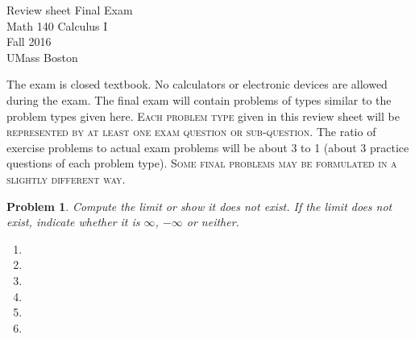 \documentclass{article}
\renewcommand{\fcProblemRef}{\theproblem.\theenumi}
\newtheorem{problem}{Problem}
\begin{document}
\begin{center}
\Large
Review sheet Final Exam \\ Math 140 Calculus I \\ \normalsize Fall 2016 \\ UMass Boston
\end{center}


\noindent The exam is closed textbook. {\sc No calculators or electronic devices are allowed during the exam.} The final exam will contain problems of types similar to the problem types given here. \textsc{Each problem type} given in this review sheet will be \textsc{represented by at least one exam question or sub-question}. The ratio of exercise problems to actual exam problems will be about 3 to 1 (about 3 practice questions of each problem type). \textsc{Some final problems may be formulated in a slightly different way.} 

\begin{problem}Compute the limit or show it does not exist. If the limit does not exist, indicate whether it is $\infty$, $-\infty$ or neither.
\begin{multicols}{2}
\begin{enumerate}[ref={\fcProblemRef}]
\item 
\item 
\item 
\item 
\item 
\item 

\end{enumerate}
\end{multicols}
\end{problem}


\end{document}

